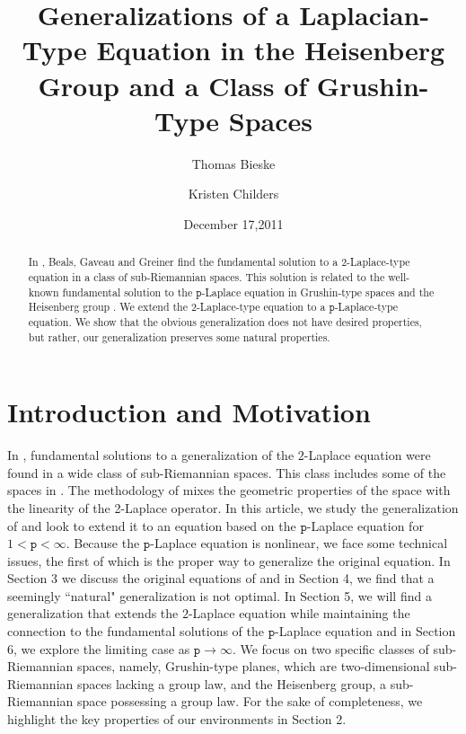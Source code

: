 \documentclass[12pt]{amsart}
\theoremstyle{plain}
\theoremstyle{definition}
\numberwithin{equation}{section}
\begin{document}
\title[Generalizations of a Laplacian-Type Equation]{Generalizations of a Laplacian-Type Equation in the Heisenberg Group and a Class of Grushin-Type Spaces}
\author{Thomas Bieske}
\author{Kristen Childers}
\address{Department of Mathematics\\
University of South Florida\\ 
Tampa, FL 33620, USA}
\address{Department of Mathematics\\
University of South Florida\\ 
Tampa, FL 33620, USA}
\date{December 17,2011}

\begin{abstract}
In \cite{BGG}, Beals, Gaveau and Greiner find the fundamental solution to a $2$-Laplace-type equation in a class of sub-Riemannian spaces. This solution is related to the well-known fundamental solution to the ${\texttt{p}}$-Laplace equation in Grushin-type spaces \cite{BG} and the Heisenberg group \cite{CDG}. We extend the $2$-Laplace-type equation to a ${\texttt{p}}$-Laplace-type equation. We show that the obvious generalization does not have  desired properties, but rather, our generalization preserves some natural properties. 
\end{abstract}
\maketitle
\section{Introduction and Motivation}
In \cite{BGG}, fundamental solutions to a generalization of the $2$-Laplace equation were found in a wide class of sub-Riemannian spaces.  This class includes some of the spaces in \cite{CDG, HH, BG}. The methodology of \cite{BGG} mixes the geometric properties of the space with the linearity of the 2-Laplace operator.  In this article, we study the generalization of \cite{BGG} and look to extend it to an equation based on the ${\texttt{p}}$-Laplace equation for $1<{\texttt{p}}<\infty$. Because the ${\texttt{p}}$-Laplace equation is nonlinear, we face some technical issues, the first of which is the proper way to generalize the original equation. In Section 3 we discuss the original equations of \cite{BGG} and in Section 4, we find that a seemingly ``natural" generalization is not optimal. In Section 5, we will find a generalization that extends the $2$-Laplace equation while maintaining the connection to the fundamental solutions of the ${\texttt{p}}$-Laplace equation and in Section 6, we explore the limiting case as ${\texttt{p}} \to \infty$. We focus on two specific classes of sub-Riemannian spaces, namely, Grushin-type planes, which are two-dimensional sub-Riemannian spaces lacking a group law, and the Heisenberg group, a sub-Riemannian space possessing a group law. For the sake of completeness, we highlight the key properties of our environments in Section 2.  
\end{document}
